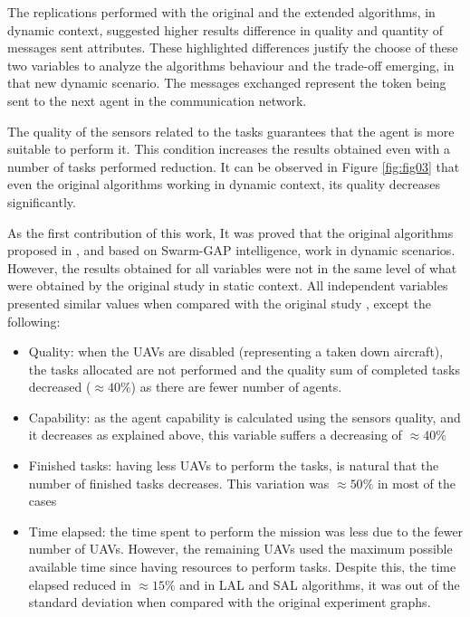 The replications performed with the original and the extended algorithms, in dynamic context, suggested higher results difference in quality and quantity of messages sent attributes. These highlighted differences justify the choose of these two variables to analyze the algorithms behaviour and the trade-off emerging, in that new dynamic scenario. The messages exchanged represent the token being sent to the next agent in the communication network.

The quality of the sensors related to the tasks guarantees that the agent is more suitable to perform it. This condition increases the results obtained even with a number of tasks performed reduction. It can be observed in Figure \ref{fig:fig03} that even the original algorithms working in dynamic context, its quality decreases significantly. 

As the first contribution of this work, It was proved that the original algorithms proposed in \cite{MAS07}, and based on Swarm-GAP intelligence, work in dynamic scenarios. However, the results obtained for all variables were not in the same level of what were obtained by the original study in static context. All independent variables presented similar values when compared with the original study \cite{MAS07}, except the following:

\begin{itemize}
   \item Quality: when the UAVs are disabled (representing a taken down aircraft), the tasks allocated are not performed and the quality sum of completed tasks decreased ($\approx 40\%$) as there are fewer number of agents.
   \item Capability: as the agent capability is calculated using the sensors quality,  and it decreases as explained above, this variable suffers a decreasing of $\approx 40\%$
   \item Finished tasks: having less UAVs to perform the tasks, is natural that the number of finished tasks decreases. This variation was $\approx 50\%$ in most of the cases
   \item Time elapsed: the time spent to perform the mission was less due to the fewer number of UAVs. However, the remaining UAVs used the maximum possible available time since having resources to perform tasks. Despite this, the time elapsed reduced in $\approx 15\%$ and in LAL and SAL algorithms, it was out of the standard deviation when compared with the original experiment graphs.
\end{itemize}

